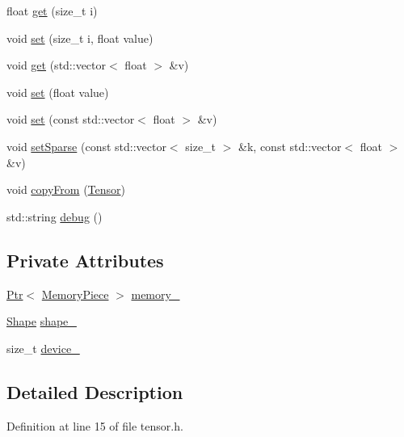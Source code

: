 \begin{DoxyCompactItemize}
float \hyperlink{classmarian_1_1TensorBase_a7e314b9f748c97582b8828d030d95392}{get} (size\+\_\+t i)
\item 
void \hyperlink{classmarian_1_1TensorBase_a71a6d16f11e6e9cb81ee432d47ff8384}{set} (size\+\_\+t i, float value)
\item 
void \hyperlink{classmarian_1_1TensorBase_ac74a5bcfcf3e06c3a90a61974167d72c}{get} (std\+::vector$<$ float $>$ \&v)
\item 
void \hyperlink{classmarian_1_1TensorBase_ade643d2744839460f321ca1c06a0929d}{set} (float value)
\item 
void \hyperlink{classmarian_1_1TensorBase_a923d9d297704c6a83478e024f75b1af3}{set} (const std\+::vector$<$ float $>$ \&v)
\item 
void \hyperlink{classmarian_1_1TensorBase_a86fbac9f53e727f7c1777cfc91a0d4c5}{set\+Sparse} (const std\+::vector$<$ size\+\_\+t $>$ \&k, const std\+::vector$<$ float $>$ \&v)
\item 
void \hyperlink{classmarian_1_1TensorBase_a4a485c5ed143b21af0984875094dd020}{copy\+From} (\hyperlink{namespacemarian_a88b71ec34bb354564cddc24eb80f7e14}{Tensor})
\item 
std\+::string \hyperlink{classmarian_1_1TensorBase_a87368e8344d51db32558263242e6343e}{debug} ()
\end{DoxyCompactItemize}
\subsection*{Private Attributes}
\begin{DoxyCompactItemize}
\item 
\hyperlink{namespacemarian_ad1a373be43a00ef9ce35666145137b08}{Ptr}$<$ \hyperlink{classmarian_1_1MemoryPiece}{Memory\+Piece} $>$ \hyperlink{classmarian_1_1TensorBase_a3283bb8429b1225b1790a5569cda8022}{memory\+\_\+}
\item 
\hyperlink{structmarian_1_1Shape}{Shape} \hyperlink{classmarian_1_1TensorBase_acf1bac1c20fdd4cbed780b74ad05bcae}{shape\+\_\+}
\item 
size\+\_\+t \hyperlink{classmarian_1_1TensorBase_a67a05977eed105fde5c494ce332564ff}{device\+\_\+}
\end{DoxyCompactItemize}


\subsection{Detailed Description}


Definition at line 15 of file tensor.\+h.



